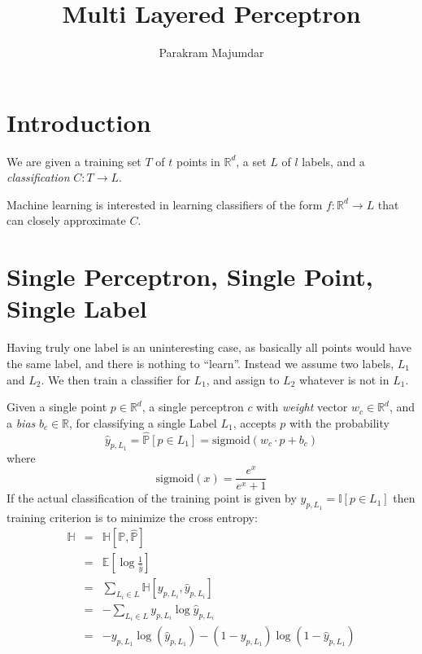 \documentclass{article}
\title{Multi Layered Perceptron}
\author{Parakram Majumdar}
\begin{document}
  \maketitle

\newcommand{\R}{\mathbb{R}}
\newcommand{\Prob}[2]{\mathbb{#1}\left[ #2 \right]}
\newcommand{\sigmoid}[1]{\text{sigmoid}\left(#1\right)}
\newcommand{\map}[2]{\text{map}\left(#1,#2\right)}
  
\section{Introduction}
  We are given a training set $T$ of $t$ points in $\R^d$,
  a set $L$ of $l$ labels,
  and a \emph{classification} $C: T \rightarrow L$.
  
  Machine learning is interested in learning classifiers of the form
  $f: \R^d \rightarrow L$ that can closely approximate $C$.

\section{Single Perceptron, Single Point, Single Label}
  Having truly one label is an uninteresting case,
  as basically all points would have the same label,
  and there is nothing to ``learn''.
  Instead we assume two labels, $L_1$ and $L_2$.
  We then train a classifier for $L_1$,
  and assign to $L_2$ whatever is not in $L_1$.
  
  Given a single point $p \in \R^d$,
  a single perceptron $c$ 
  with \emph{weight} vector $w_c \in \R^d$, 
  and a \emph{bias} $b_c \in \R$,
  for classifying a single Label $L_1$,
  accepts $p$ with the probability
  \[ \hat y_{p,L_1} = \Prob{\hat P}{p \in L_1} =  \sigmoid{w_c \cdot p + b_c}\]
  where
  \[ \sigmoid{x} = \frac{e^x}{e^{x} + 1} \]
  If the actual classification of the training point 
  is given by $y_{p,L_1} = \Prob{I}{p \in L_1}$
  then training criterion is to minimize 
  the cross entropy:
  \begin{eqnarray*} 
    \mathbb{H} & = & \Prob{H}{\mathbb{P}, \mathbb{\hat P}} \\
               & = & \Prob{E}{\log{ \frac{1}{\hat y}}} \\
               & = & \sum_{L_i \in L}{\Prob{H}{y_{p, L_i}, \hat y_{p, L_i}}}\\
               & = & -\sum_{L_i \in L}{y_{p, L_i}\log{\hat y_{p, L_i}}}\\
               & = & -y_{p,L_1}\log(\hat y_{p,L_1}) - (1 - y_{p,L_1})\log(1 - \hat y_{p,L_1})
   \end{eqnarray*}
\end{document}
